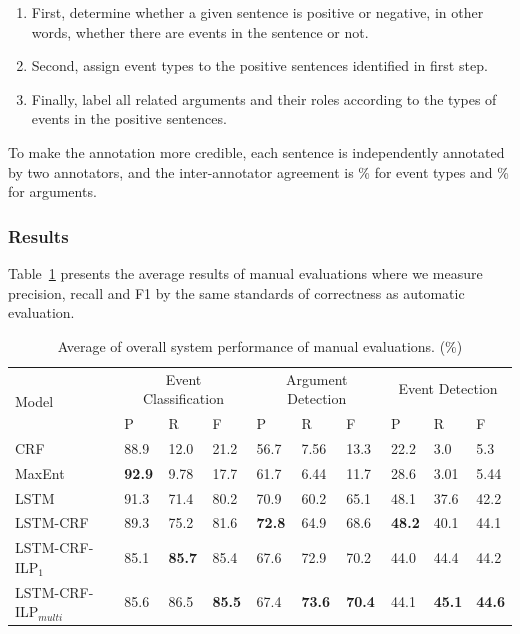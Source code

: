 \documentclass{article}
\begin{document}
\begin{enumerate}
	\item First, determine whether a given sentence is positive or negative, in other words, whether there are events in the sentence or not.
	\item Second, assign event types to the positive sentences identified in first step.
	\item Finally, label all related arguments and their roles according to the types of events in the positive sentences.
\end{enumerate}

To make the annotation more credible, each sentence is independently annotated by two annotators, and the inter-annotator agreement is \% for event types and \% for arguments.

\subsubsection{Results}
Table~\ref{tab:2} presents the average results of manual evaluations where we measure precision, recall and F1 by the same standards of correctness as automatic evaluation.  

\begin{table}[t]
\centering
\begin{tabular}{|l|p{0.8cm}<{\centering}|p{0.8cm}<{\centering}|p{0.8cm}<{\centering}|p{0.8cm}<{\centering}|p{0.8cm}<{\centering}|p{0.8cm}<{\centering}|p{0.8cm}<{\centering}|p{0.8cm}<{\centering}|p{0.8cm}<{\centering}|} \hline
	\multirow{2}{*}{Model} & \multicolumn{3}{c|}{Event Classification} & \multicolumn{3}{c|}{Argument Detection} & 
	\multicolumn{3}{c|}{Event Detection} \\ \cline{2-10}
	 & P & R & F & P & R & F & P & R & F \\ \hline
	CRF & 88.9 & 12.0 & 21.2 & 56.7 & 7.56 & 13.3 & 22.2 & 3.0 & 5.3 \\ \hline
	MaxEnt & \textbf{92.9} & 9.78 & 17.7 & 61.7 & 6.44 & 11.7 & 28.6 & 3.01 & 5.44 \\ \hline
	LSTM & 91.3 & 71.4 & 80.2 & 70.9 & 60.2 & 65.1 & 48.1 & 37.6 & 42.2 \\ \hline \hline
	LSTM-CRF & 89.3 & 75.2 & 81.6 & \textbf{72.8} & 64.9 & 68.6 & \textbf{48.2} & 40.1 & 44.1  \\ \hline
	LSTM-CRF-ILP$_{1}$ & 85.1 & \textbf{85.7} & 85.4 & 67.6 & 72.9 & 70.2 & 44.0 & 44.4 & 44.2 \\ \hline
	LSTM-CRF-ILP$_{multi}$ & 85.6 & 86.5 & \textbf{85.5} & 67.4 & \textbf{73.6} & \textbf{70.4} & 44.1 & \textbf{45.1} & \textbf{44.6} \\ \hline
\end{tabular}
\caption{Average of overall system performance of manual evaluations. (\%) \label{tab:2}}
\end{table}
\end{document}
